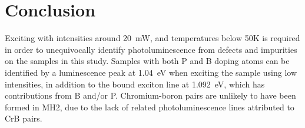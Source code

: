 \section{Conclusion}

Exciting with intensities around 20~mW, and temperatures below 50K is required in order to unequivocally identify photoluminescence from defects and impurities on the samples in this study.
Samples with both P and B doping atoms can be identified by a luminescence peak at 1.04~eV when exciting the sample using low intensities, in addition to the bound exciton line at 1.092~eV, which has contributions from B and/or P. Chromium-boron pairs are unlikely to have been formed in MH2, due to the lack of related photoluminescence lines attributed to CrB pairs.